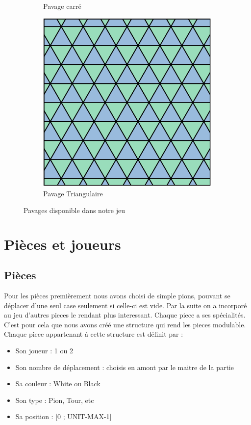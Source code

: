 \begin{figure}[htbp]
\begin{subfigure}{0.3\textwidth}
\caption{Pavage carré}
\label{label_de_l_image_2}
\end{subfigure}
\quad 
\begin{subfigure}{0.3\textwidth}
\centering
\includegraphics[width=\textwidth]{plateautri.png}
\caption{Pavage Triangulaire}
\label{label_de_l_image_3}
\end{subfigure}
\caption{Pavages disponible dans notre jeu}
\label{label_de_la_figure 1}
\end{figure}


\section{Pièces et joueurs}
\subsection{Pièces}
 Pour les pièces premièrement nous avons choisi de simple pions, pouvant se déplacer d'une seul case seulement si celle-ci est vide. Par la suite on a incorporé au jeu d'autres pieces le rendant plus interessant. Chaque piece a ses spécialités.\\ 
        C'est pour cela que nous avons créé une structure qui rend les pieces modulable. Chaque piece appartenant à cette structure est définit par : 
        \begin{itemize}
            \item Son joueur : 1 ou 2 
            \item Son nombre de déplacement : choisis en amont par le maitre de la partie
            \item Sa couleur : White ou Black 
            \item Son type : Pion, Tour, etc
            \item Sa position : [0 ; UNIT-MAX-1]\\
        \end{itemize}

